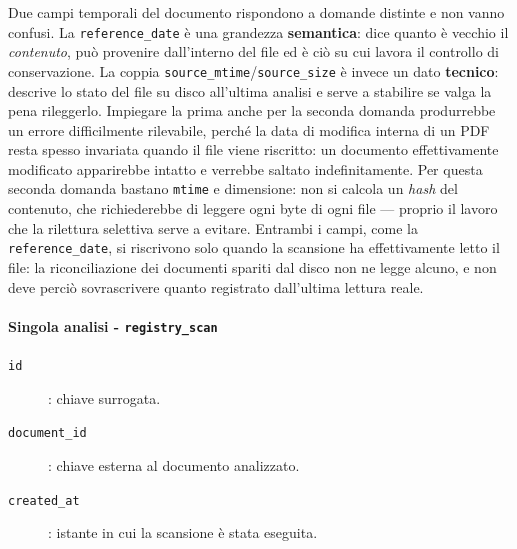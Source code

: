 Due campi temporali del documento rispondono a domande distinte e non vanno confusi. La \texttt{reference\_date} è una grandezza \textbf{semantica}: dice quanto è vecchio il \emph{contenuto}, può provenire dall'interno del file ed è ciò su cui lavora il controllo di conservazione. La coppia \texttt{source\_mtime}/\texttt{source\_size} è invece un dato \textbf{tecnico}: descrive lo stato del file su disco all'ultima analisi e serve a stabilire se valga la pena rileggerlo. Impiegare la prima anche per la seconda domanda produrrebbe un errore difficilmente rilevabile, perché la data di modifica interna di un PDF resta spesso invariata quando il file viene riscritto: un documento effettivamente modificato apparirebbe intatto e verrebbe saltato indefinitamente. Per questa seconda domanda bastano \texttt{mtime} e dimensione: non si calcola un \emph{hash} del contenuto, che richiederebbe di leggere ogni byte di ogni file --- proprio il lavoro che la rilettura selettiva serve a evitare. Entrambi i campi, come la \texttt{reference\_date}, si riscrivono solo quando la scansione ha effettivamente letto il file: la riconciliazione dei documenti spariti dal disco non ne legge alcuno, e non deve perciò sovrascrivere quanto registrato dall'ultima lettura reale.

\paragraph*{Singola analisi - \texttt{registry\_scan}}
\begin{description}
	\item[\texttt{id}]: chiave surrogata.
	\item[\texttt{document\_id}]: chiave esterna al documento analizzato.
	\item[\texttt{created\_at}]: istante in cui la scansione è stata eseguita.
\end{description}

